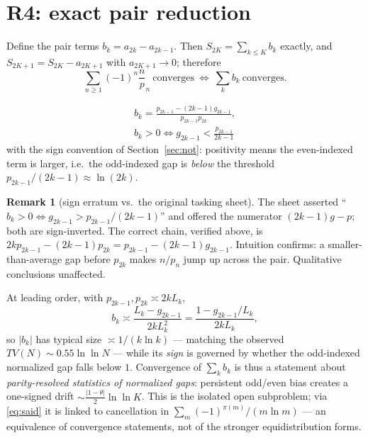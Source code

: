 \documentclass[11pt]{article}
\theoremstyle{definition}
\newtheorem{remark}[theorem]{Remark}
\begin{document}
\section{R4: exact pair reduction}\label{sec:r4}

Define the pair terms $b_k=a_{2k}-a_{2k-1}$. Then $S_{2K}=\sum_{k\le K}b_k$ exactly, and $S_{2K+1}=S_{2K}-a_{2K+1}$ with $a_{2K+1}\to0$; therefore
\begin{equation}\label{eq:equiv}
\boxed{\ \sum_{n\ge1}(-1)^n\frac np_n\ \text{converges}\ \iff\ \sum_{k}b_k\ \text{converges}.\ }
\end{equation}

\begin{equation}\label{eq:pairbox}
\boxed{\begin{gathered}
b_k=\frac{p_{2k-1}-(2k-1)g_{2k-1}}{p_{2k-1}p_{2k}},\\[4pt]
b_k>0\iff g_{2k-1}<\frac{p_{2k-1}}{2k-1}
\end{gathered}}
\end{equation}
with the sign convention of Section~\ref{sec:not}: positivity means the even-indexed term is larger, i.e.\ the odd-indexed gap is \emph{below} the threshold $p_{2k-1}/(2k-1)\approx\ln(2k)$.

\begin{remark}[sign erratum vs.\ the original tasking sheet]
The sheet asserted ``$b_k>0\iff g_{2k-1}>p_{2k-1}/(2k-1)$'' and offered the numerator $(2k-1)g-p$; both are sign-inverted. The correct chain, verified above, is $2kp_{2k-1}-(2k-1)p_{2k}=p_{2k-1}-(2k-1)g_{2k-1}$. Intuition confirms: a smaller-than-average gap before $p_{2k}$ makes $n/p_n$ jump up across the pair. Qualitative conclusions unaffected.
\end{remark}

At leading order, with $p_{2k-1},p_{2k}\asymp2kL_k$,
\begin{equation}\label{eq:lead}
b_k\asymp\frac{L_k-g_{2k-1}}{2kL_k^2}=\frac{1-g_{2k-1}/L_k}{2kL_k},
\end{equation}
so $|b_k|$ has typical size $\asymp1/(k\ln k)$ --- matching the observed $TV(N)\sim0.55\ln\ln N$ --- while its \emph{sign} is governed by whether the odd-indexed normalized gap falls below $1$. Convergence of $\sum_kb_k$ is thus a statement about \emph{parity-resolved statistics of normalized gaps}: persistent odd/even bias creates a one-signed drift $\sim\frac{|1-\theta|}{2}\ln\ln K$. This is the isolated open subproblem; via \eqref{eq:said} it is linked to cancellation in $\sum_m(-1)^{\pi(m)}/(m\ln m)$ --- an equivalence of convergence statements, not of the stronger equidistribution forms.
\end{document}
